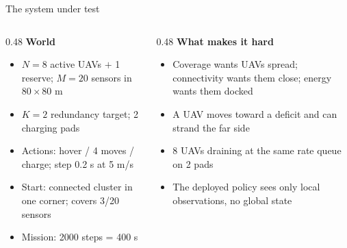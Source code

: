 \documentclass[aspectratio=169,10pt]{beamer}
\begin{document}
\begin{frame}{The system under test}
  \small
  \begin{columns}
    \begin{column}{0.48\textwidth}
      \textbf{World}
      \begin{itemize}
        \item $N=8$ active UAVs $+$ 1 reserve; $M=20$ sensors in $80\times80$ m
        \item $K=2$ redundancy target; 2 charging pads
        \item Actions: hover / 4 moves / charge; step 0.2 s at 5 m/s
        \item Start: connected cluster in one corner; covers 3/20 sensors
        \item Mission: 2000 steps = 400 s
      \end{itemize}
    \end{column}
    \begin{column}{0.48\textwidth}
      \textbf{What makes it hard}
      \begin{itemize}
        \item Coverage wants UAVs spread; connectivity wants them close; energy wants them docked
        \item A UAV moves toward a deficit and can strand the far side
        \item 8 UAVs draining at the same rate queue on 2 pads
        \item The deployed policy sees only local observations, no global state
      \end{itemize}
    \end{column}
  \end{columns}
\end{frame}
\end{document}
